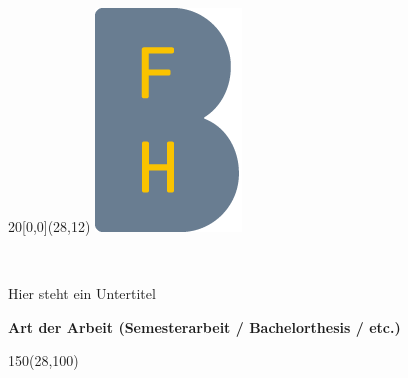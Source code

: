 %
%

\begin{titlepage}


\setlength{\unitlength}{1mm}
\begin{textblock}{20}[0,0](28,12)
	\includegraphics[scale=1.0]{bilder/BFH_Logo_B.png}
\end{textblock}
\color{black}

\begin{flushleft}

\vspace*{21mm}

\fontsize{26pt}{40pt}\selectfont 
\titel 				\\							%
\vspace{2mm}

\fontsize{16pt}{24pt}\selectfont\vspace{0.3em}
Hier steht ein Untertitel 			\\							%
\vspace{5mm}

\fontsize{10pt}{12pt}\selectfont
\textbf{Art der Arbeit (Semesterarbeit / Bachelorthesis / etc.)} \\									%
\vspace{7mm}

\begin{textblock}{150}(28,100)
\fontsize{10pt}{12pt}\selectfont


\end{textblock}
\end{flushleft}
\end{titlepage}
